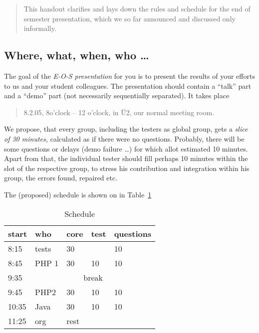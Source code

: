 \documentclass[11pt,handout]{handout}
\begin{document}
\thispagestyle{empty}





\begin{abstract}
  This handout clarifies and lays down the rules and schedule for the end
  of semester presentation, which we so far announced and discussed only
  informally.
\end{abstract}



\subsection*{Where, what, when, who \ldots}

The goal of the \emph{E-O-S presentation} for you is to present the results
of your efforts to us and your student colleagues. The presentation should
contain a ``talk'' part and a ``demo'' part (not necessarily sequentially
separated). It takes place
\begin{quotation}
  8.2.05, 8o'clock -- 12 o'clock, in {\"U}2, our normal meeting room.
\end{quotation}

We propose, that every group, including the testers as global group, gets a
\emph{slice of 30 minutes,} calculated as if there were no questions.
Probably, there will be some questions or delays (demo failure \ldots) for
which allot estimated 10 minutes. Apart from that, the individual tester
should fill perhaps 10 minutes within the slot of the respective group, to
stress his contribution and integration within his group, the errors
found, repaired etc.

The (proposed) schedule is shown on in Table~\ref{tab:schedule}



\begin{table}[htbp]
  \centering
  \begin{tabular}[t]{l|llll}
    start &  who & core &  test & questions
    \\\hline
    8:15 & tests & 30 & & 10
    \\
    8:45 & PHP 1 & 30 & 10 &10
    \\
    9:35 & \multicolumn{4}{c}{break}
    \\
    9:45 & PHP2 & 30 &10 &10
    \\
    10:35 & Java & 30 & 10 & 10
    \\
    11:25 & org & rest
  \end{tabular}
  \caption{Schedule}
  \label{tab:schedule}
\end{table}
\end{document}
